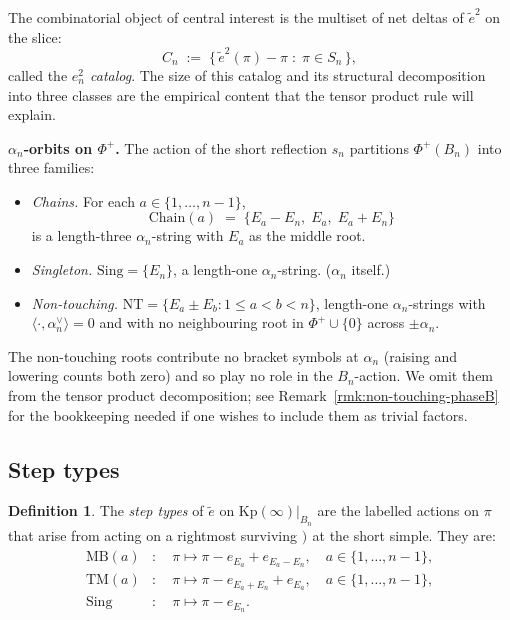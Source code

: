 \documentclass[11pt]{article}
\theoremstyle{definition}
\newtheorem{definition}[theorem]{Definition}
\theoremstyle{remark}
\newcommand{\Kp}{\mathrm{Kp}}
\newcommand{\NT}{\mathrm{NT}}
\newcommand{\Sing}{\mathrm{Sing}}
\newcommand{\Chain}{\mathrm{Chain}}
\newcommand{\MB}{\mathrm{MB}}
\newcommand{\TM}{\mathrm{TM}}
\newcommand{\labr}[1]{{)}_{#1}}
\begin{document}
The combinatorial object of central interest is the multiset of net deltas of $\tilde e^2$
on the slice:
\[
C_n \;:=\; \bigl\{\,\tilde e^2(\pi) - \pi \;:\; \pi \in S_n\,\bigr\},
\]
called the \emph{$e_n^2$ catalog}. The size of this catalog and its structural decomposition
into three classes are the empirical content that the tensor product rule will explain.

\medskip
\noindent\textbf{$\alpha_n$-orbits on $\Phi^+$.}
The action of the short reflection $s_n$ partitions $\Phi^+(B_n)$ into three families:

\begin{itemize}[leftmargin=2em]
  \item \emph{Chains.} For each $a \in \{1, \ldots, n-1\}$,
    \[
    \Chain(a) \;=\; \{E_a - E_n,\; E_a,\; E_a + E_n\}
    \]
    is a length-three $\alpha_n$-string with $E_a$ as the middle root.
  \item \emph{Singleton.} $\Sing = \{E_n\}$, a length-one $\alpha_n$-string. ($\alpha_n$
    itself.)
  \item \emph{Non-touching.} $\NT = \{E_a \pm E_b : 1 \leq a < b < n\}$, length-one
    $\alpha_n$-strings with $\langle \cdot, \alpha_n^\vee\rangle = 0$ and with no neighbouring
    root in $\Phi^+ \cup \{0\}$ across $\pm \alpha_n$.
\end{itemize}

The non-touching roots contribute no bracket symbols at $\alpha_n$ (raising and lowering
counts both zero) and so play no role in the $B_n$-action. We omit them from the tensor
product decomposition; see Remark~\ref{rmk:non-touching-phaseB} for the bookkeeping needed
if one wishes to include them as trivial factors.

\subsection{Step types}\label{ssec:step-types}

\begin{definition}\label{def:step-types}
The \emph{step types} of $\tilde e$ on $\Kp(\infty)|_{B_n}$ are the labelled actions on
$\pi$ that arise from acting on a rightmost surviving $\labr{}$ at the short simple. They are:
\begin{align*}
\MB(a) &: \quad \pi \mapsto \pi - e_{E_a} + e_{E_a - E_n}, \quad a \in \{1, \ldots, n-1\}, \\
\TM(a) &: \quad \pi \mapsto \pi - e_{E_a + E_n} + e_{E_a}, \quad a \in \{1, \ldots, n-1\}, \\
\Sing &: \quad \pi \mapsto \pi - e_{E_n}.
\end{align*}
\end{definition}
\end{document}
